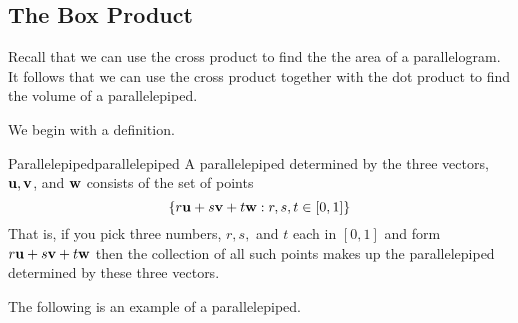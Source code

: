 \subsection{The Box Product}

Recall that we can use the cross product to find the the area of a parallelogram. It follows that we can use the 
cross product together with the dot product to find the volume of a parallelepiped.

We begin with a definition.

\begin{definition}{Parallelepiped}{parallelepiped}
A parallelepiped
 determined by the three vectors, ${\bf u},{\bf v}$, and ${\bf w}$ consists of the set of points
\begin{equation*}
\left\{ r{\bf u}+s{\bf v}+t{\bf w}:r,s,t\in \left[ 0,1\right]
\right\} 
\end{equation*}
That is, if you pick three numbers, $r,s,$ and $t$ each in $\left[ 0,1\right]
$ and form $r{\bf u}+s{\bf v}+t{\bf w}$ then the collection of all
such points makes up the parallelepiped
determined by these three vectors.
\end{definition}

The following is an example of a parallelepiped.

\begin{center}
\end{center}

